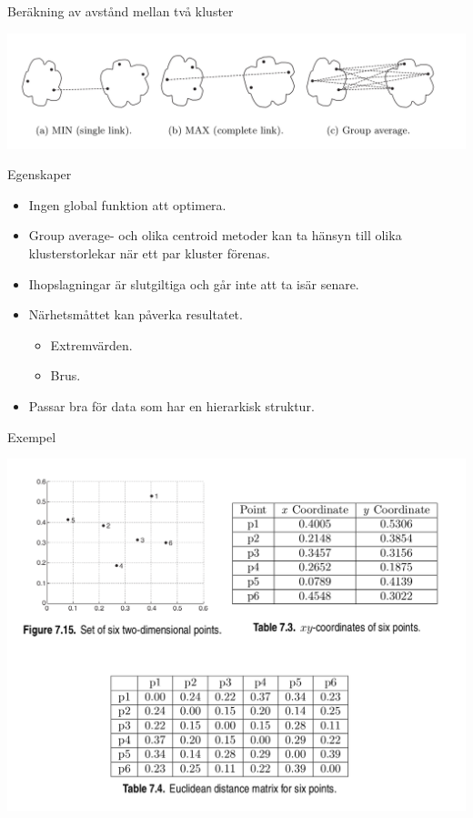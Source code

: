 \documentclass[10pt,english]{beamer}
\begin{document}
\begin{frame}{Beräkning av avstånd mellan två kluster}

    \includegraphics[width = \textwidth]{figs/linking_pic.png}
    
\end{frame}

\begin{frame}{Egenskaper}

    \begin{itemize}
        \item Ingen global funktion att optimera.
        \item Group average- och olika centroid metoder kan ta hänsyn till olika klusterstorlekar när ett par kluster förenas.
        \item Ihopslagningar är slutgiltiga och går inte att ta isär senare.
        \item Närhetsmåttet kan påverka resultatet.
        \begin{itemize}
            \item Extremvärden.
            \item Brus.
        \end{itemize}
        \item Passar bra för data som har en hierarkisk struktur.
    \end{itemize}
    
\end{frame}

\begin{frame}{Exempel}
    
    \includegraphics[width=\textwidth]{figs/ex_data.png}

\end{frame}
\end{document}
